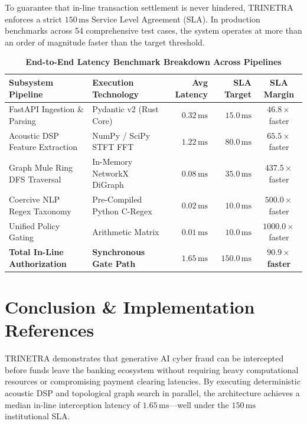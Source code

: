 \documentclass[11pt,a4paper]{article}
\begin{document}
To guarantee that in-line transaction settlement is never hindered, TRINETRA enforces a strict $150\,\text{ms}$ Service Level Agreement (SLA). In production benchmarks across 54 comprehensive test cases, the system operates at more than an order of magnitude faster than the target threshold.

\begin{table}[!ht]
\centering
\small
\caption{\textbf{End-to-End Latency Benchmark Breakdown Across Pipelines}}
\label{tab:latency}
\begin{tabular}{llrrc}
\toprule
\textbf{Subsystem Pipeline} & \textbf{Execution Technology} & \textbf{Avg Latency} & \textbf{SLA Target} & \textbf{SLA Margin} \\
\midrule
FastAPI Ingestion \& Parsing & Pydantic v2 (Rust Core) & $0.32\,\text{ms}$ & $15.0\,\text{ms}$ & $46.8\times$ faster \\
Acoustic DSP Feature Extraction & NumPy / SciPy STFT FFT & $1.22\,\text{ms}$ & $80.0\,\text{ms}$ & $65.5\times$ faster \\
Graph Mule Ring DFS Traversal & In-Memory NetworkX DiGraph & $0.08\,\text{ms}$ & $35.0\,\text{ms}$ & $437.5\times$ faster \\
Coercive NLP Regex Taxonomy & Pre-Compiled Python C-Regex & $0.02\,\text{ms}$ & $10.0\,\text{ms}$ & $500.0\times$ faster \\
Unified Policy Gating & Arithmetic Matrix & $0.01\,\text{ms}$ & $10.0\,\text{ms}$ & $1000.0\times$ faster \\
\midrule
\textbf{Total In-Line Authorization} & \textbf{Synchronous Gate Path} & \textbf{$1.65\,\text{ms}$} & \textbf{$150.0\,\text{ms}$} & \textbf{$90.9\times$ faster} \\
\bottomrule
\end{tabular}
\end{table}

\section{Conclusion \& Implementation References}
\label{sec:conclusion}

TRINETRA demonstrates that generative AI cyber fraud can be intercepted before funds leave the banking ecosystem without requiring heavy computational resources or compromising payment clearing latencies. By executing deterministic acoustic DSP and topological graph search in parallel, the architecture achieves a median in-line interception latency of $1.65\,\text{ms}$—well under the $150\,\text{ms}$ institutional SLA.
\end{document}
